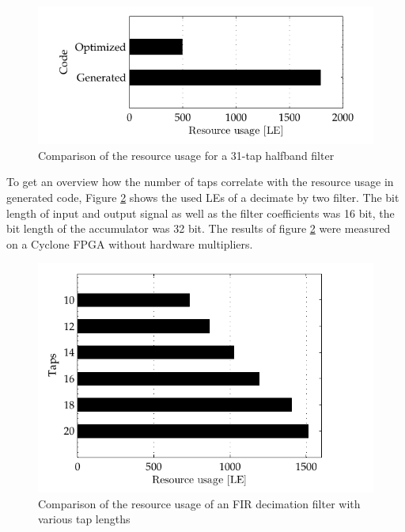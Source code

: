 \begin{figure}[htbp]
	\centering
		\includegraphics{../kapitel02/figures/fir2_fpga.pdf}
	\caption{Comparison of the resource usage for a 31-tap halfband filter}
	\label{fig:fir2_fpga}
\end{figure}

To get an overview how the number of taps correlate with the resource usage in generated code, Figure \ref{fig:fir_fpga} shows the used \acp{LE} of a decimate by two filter. The bit length of input and output signal as well as the filter coefficients was 16 bit, the bit length of the accumulator was 32 bit. The results of figure \ref{fig:fir_fpga} were measured on a Cyclone FPGA without hardware multipliers.

\begin{figure}[htbp]
	\centering
		\includegraphics{../kapitel02/figures/fir_fpga.pdf}
	\caption{Comparison of the resource usage of an FIR decimation filter with various tap lengths}
	\label{fig:fir_fpga}
\end{figure}


